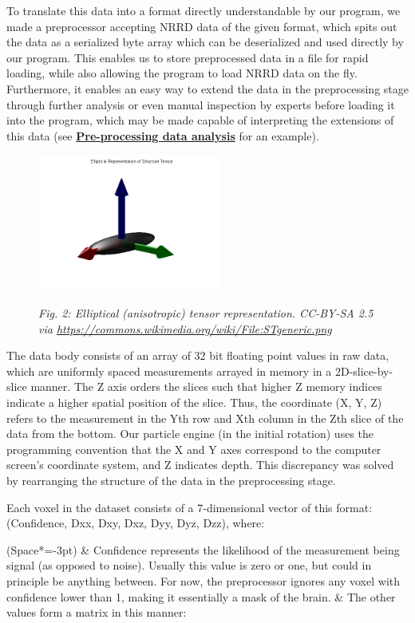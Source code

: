 \documentclass{article}
\newcommand{\secref}[2]{\hyperref[sec:#1]{\textbf{#2}}}
\begin{document}
To translate this data into a format directly understandable by our program, we made a preprocessor accepting NRRD data of the given format, which spits out the data as a serialized byte array which can be deserialized and used directly by our program. This enables us to store preprocessed data in a file for rapid loading, while also allowing the program to load NRRD data on the fly. Furthermore, it enables an easy way to extend the data in the preprocessing stage through further analysis or even manual inspection by experts before loading it into the program, which may be made capable of interpreting the extensions of this data (see \secref{prepro}{Pre-processing data analysis} for an example).

\begin{figure}
  \centering
    \includegraphics[width=6cm]{STgeneric}
    \raggedright%
    \textit{Fig. 2: Elliptical (anisotropic) tensor representation. CC-BY-SA 2.5 via \url{https://commons.wikimedia.org/wiki/File:STgeneric.png}}
\end{figure}

The data body consists of an array of 32 bit floating point values in raw data, which are uniformly spaced measurements arrayed in memory in a 2D-slice-by-slice manner. The Z axis orders the slices such that higher Z memory indices indicate a higher spatial position of the slice. Thus, the coordinate (X, Y, Z) refers to the measurement in the Yth row and Xth column in the Zth slice of the data from the bottom. Our particle engine (in the initial rotation) uses the programming convention that the X and Y axes correspond to the computer screen's coordinate system, and Z indicates depth. This discrepancy was solved by rearranging the structure of the data in the preprocessing stage.

Each voxel in the dataset consists of a 7-dimensional vector of this format: (Confidence, Dxx, Dxy, Dxz, Dyy, Dyz, Dzz), where:

\begin{easylist}[itemize]
\ListProperties(Space*=-3pt)
& Confidence represents the likelihood of the measurement being signal (as opposed to noise). Usually this value is zero or one, but could in principle be anything between. For now, the preprocessor ignores any voxel with confidence lower than 1, making it essentially a mask of the brain.
& The other values form a matrix in this manner:
\end{easylist}
\end{document}
